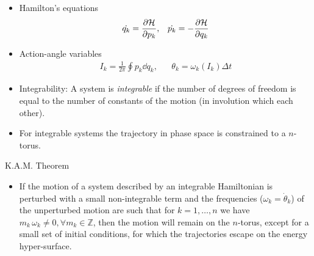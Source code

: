 \documentclass[a4,compress]{beamer}
\begin{document}
\begin{frame}
  \begin{itemize}
    \item Hamilton's equations
    \begin{align*}
      \dot{q_k} = \pdv{\mathcal{H}}{p_k}, &&
      \dot{p_k} = -\pdv{\mathcal{H}}{q_k}
    \end{align*}
    \item Action-angle variables
    \begin{align*}
      I_k = \frac{1}{2\pi}\oint p_k \dd{q_k}, &&
      \theta_k = \omega_k(I_k) \Delta t
    \end{align*}
    \item Integrability: A system is \emph{integrable} if the number of degrees
    of freedom is equal to the number of constants of the motion
    (in involution which each other).
    \item For integrable systems the trajectory in phase space is constrained
    to a $n$-torus.
  \end{itemize}
\end{frame}


\begin{frame}{K.A.M. Theorem}
  \begin{itemize}
    \item If the motion of a system described by an integrable
    Hamiltonian is perturbed with a small non-integrable term and
    the frequencies (\(\omega_k = \dot{\theta}_k\)) of the unperturbed motion
    are such that for \(k=1,\dotsc,n\) we have
    \(m_k\, \omega_k \neq 0, \forall m_k \in \mathbb{Z}\),
    then the motion will remain on the $n$-torus, except for a small
    set of initial conditions, for which the trajectories escape on the
    energy hyper-surface.

  \end{itemize}
\end{frame}

\end{document}
